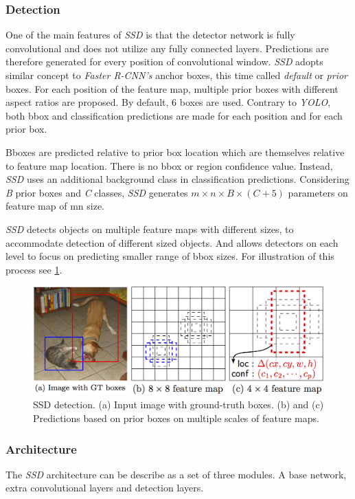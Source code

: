 \subsubsection{Detection}
One of the main features of \textit{SSD} is that the detector network is fully convolutional and does not utilize any fully connected layers. Predictions are therefore generated for every position of convolutional window. \textit{SSD} adopts similar concept to \textit{Faster R-CNN's} anchor boxes, this time called \textit{default} or \textit{prior} boxes. For each position of the feature map, multiple prior boxes with different aspect ratios are proposed. By default, 6 boxes are used. Contrary to \textit{YOLO}, both bbox and classification predictions are made for each position and for each prior box.

Bboxes are predicted relative to prior box location which are themselves relative to feature map location. There is no bbox or region confidence value. Instead, \textit{SSD} uses an additional background class in classification predictions. Considering \textit{B} prior boxes and \textit{C} classes, \textit{SSD} generates $m\times n\times B\times (C+5)$ parameters on feature map of m\x n size.

\textit{SSD} detects objects on multiple feature maps with different sizes, to accommodate detection of different sized objects. And allows detectors on each level to focus on predicting smaller range of bbox sizes. For illustration of this process see \cref{fig:ssddet}.

\begin{figure}
    \centering
    \includegraphics[width=\textwidth]{img/ssddet}
    \caption{SSD detection. (a) Input image with ground-truth boxes. (b) and (c) Predictions based on prior boxes on multiple scales of feature maps.}
    \label{fig:ssddet}
\end{figure}

\subsubsection{Architecture}
The \textit{SSD} architecture can be describe as a set of three modules. A base network, extra convolutional layers and detection layers.

